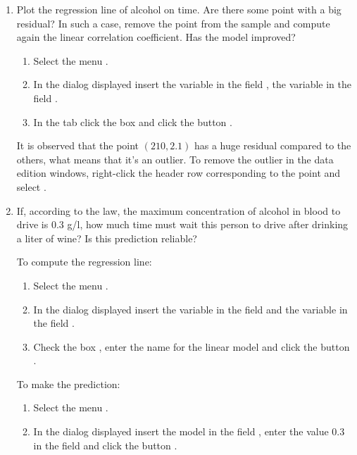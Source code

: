 \begin{enumerate}[leftmargin=*]
\begin{enumerate}
\item Plot the regression line of alcohol on time. 
Are there some point with a big residual?
In such a case, remove the point from the sample and compute again the linear correlation coefficient. 
Has the model improved?
\begin{indication}
\begin{enumerate}
\item Select the menu .
\item In the dialog displayed insert the variable  in the field , the
variable  in the field .
\item In the  tab click the box  and click the button .
\end{enumerate}
It is observed that the point $(210,2.1)$ has a huge residual compared to the others, what means that it's an outlier. 
To remove the outlier in the data edition windows, right-click the header row corresponding to the point and select
.
\end{indication}

\item If, according to the law, the maximum concentration of alcohol in blood to drive is $0.3$ g/l, how much
time must wait this person to drive after drinking a liter of wine?
Is this prediction reliable?
\begin{indication}
To compute the regression line:
\begin{enumerate}
\item Select the menu .
\item In the dialog displayed insert the variable  in the field  and the
variable  in the field .
\item Check the box , enter the name  for the linear model
and click the button .
\end{enumerate}
To make the prediction:
\begin{enumerate}
\item Select the menu .
\item In the dialog displayed insert the model  in the field , enter the value 0.3 in the field  and click the button .
\end{enumerate}
\end{indication}
\end{enumerate}



\end{enumerate}
